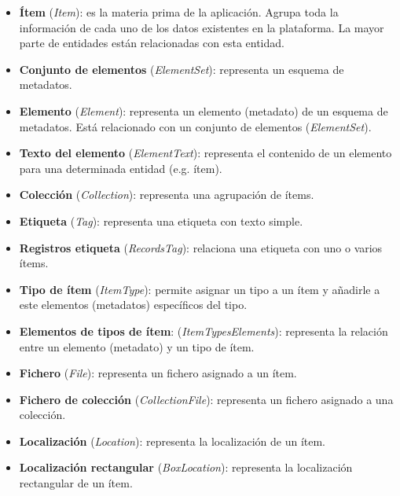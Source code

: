 \documentclass[
]{article}
\providecommand{\tightlist}{%
  \setlength{\itemsep}{0pt}\setlength{\parskip}{0pt}}
\begin{document}
\begin{itemize}
\tightlist
\item
  \textbf{Ítem} (\emph{Item}): es la materia prima de la aplicación.
  Agrupa toda la información de cada uno de los datos existentes en la
  plataforma. La mayor parte de entidades están relacionadas con esta
  entidad.
\item
  \textbf{Conjunto de elementos} (\emph{ElementSet}): representa un
  esquema de metadatos.
\item
  \textbf{Elemento} (\emph{Element}): representa un elemento (metadato)
  de un esquema de metadatos. Está relacionado con un conjunto de
  elementos (\emph{ElementSet}).
\item
  \textbf{Texto del elemento} (\emph{ElementText}): representa el
  contenido de un elemento para una determinada entidad (e.g. ítem).
\item
  \textbf{Colección} (\emph{Collection}): representa una agrupación de
  ítems.
\item
  \textbf{Etiqueta} (\emph{Tag}): representa una etiqueta con texto
  simple.
\item
  \textbf{Registros etiqueta} (\emph{RecordsTag}): relaciona una
  etiqueta con uno o varios ítems.
\item
  \textbf{Tipo de ítem} (\emph{ItemType}): permite asignar un tipo a un
  ítem y añadirle a este elementos (metadatos) específicos del tipo.
\item
  \textbf{Elementos de tipos de ítem}: (\emph{ItemTypesElements}):
  representa la relación entre un elemento (metadato) y un tipo de ítem.
\item
  \textbf{Fichero} (\emph{File}): representa un fichero asignado a un
  ítem.
\item
  \textbf{Fichero de colección} (\emph{CollectionFile}): representa un
  fichero asignado a una colección.
\item
  \textbf{Localización} (\emph{Location}): representa la localización de
  un ítem.
\item
  \textbf{Localización rectangular} (\emph{BoxLocation}): representa la
  localización rectangular de un ítem.
\end{itemize}
\end{document}

